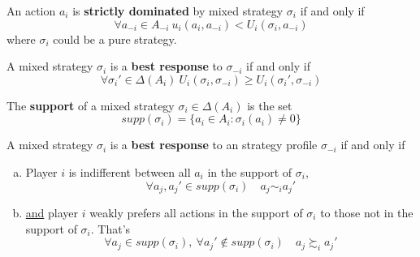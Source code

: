 \documentclass[11pt]{article}
\begin{document}
		\begin{definition}[lec.5]
			An action $a_i$ is \textbf{strictly dominated} by mixed strategy $\sigma_i$ if and only if
			\[
				\forall a_{-i} \in A_{-i} \ u_i(a_i, a_{-i}) < U_i(\sigma_i, a_{-i})
			\]
			where $\sigma_i$ could be a pure strategy.
		\end{definition}
		
		\begin{definition}[lec.5]
			A mixed strategy $\sigma_i$ is a \textbf{best response} to $\sigma_{-i}$ if and only if
			\[
				\forall \sigma_i' \in \Delta(A_i)\ U_i(\sigma_i, \sigma_{-i}) \geq U_i(\sigma_i', \sigma_{-i})
			\]
		\end{definition}
		
		\begin{definition}[lec.5]
			The \textbf{support} of a mixed strategy $\sigma_i \in \Delta(A_i)$ is the set
			\[
				supp(\sigma_i) = \{a_i \in A_i:\sigma_i(a_i) \neq 0\}
			\]
		\end{definition}
		
		\begin{proposition}[lec.5]
			A mixed strategy $\sigma_i$ is a \textbf{best response} to an strategy profile $\sigma_{-i}$ if and only if 
			\begin{enumerate}[(a)]
				\item Player $i$ is indifferent between all $a_i$ in the support of $\sigma_i$,
				\[
					\forall a_j, a_j' \in supp(\sigma_i)\quad a_j \sim_i a_j'
				\]
				\item \ul{and} player $i$ weakly prefers all actions in the support of $\sigma_i$ to those not in the support of $\sigma_i$. That's
				\[
					\forall a_j \in supp(\sigma_i),\ \forall a_j' \notin supp(\sigma_i)\quad a_j \succsim_i a_j'
				\]
			\end{enumerate}
		\end{proposition}
		
\end{document}
